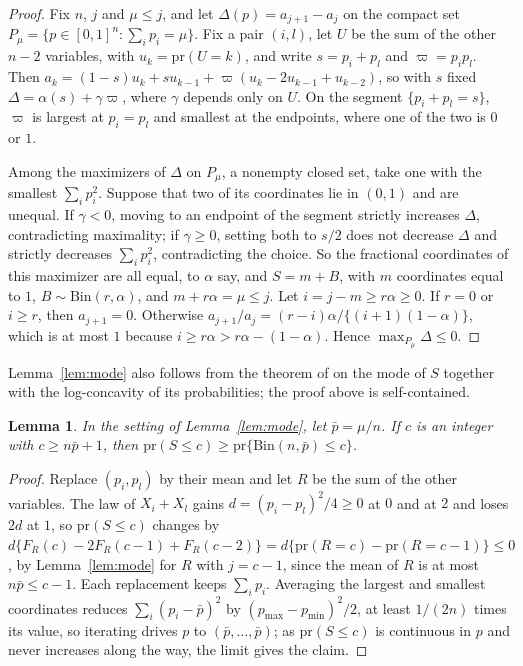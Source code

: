 \documentclass[12pt]{article}
\renewcommand{\_}{\usc\allowbreak}
\newtheorem{lemma}{Lemma}
\theoremstyle{definition}
\numberwithin{equation}{section}
\newcommand{\pr}{\mathrm{pr}}
\newcommand{\Bin}{\mathrm{Bin}}
\begin{document}
\begin{proof}
Fix $n$, $j$ and $\mu \le j$, and let $\Delta(p) = a_{j+1} - a_j$ on the compact set $P_\mu = \{p \in [0, 1]^n : \sum_ip_i = \mu\}$. Fix a pair $(i, l)$, let $U$ be the sum of the other $n - 2$ variables, with $u_k = \pr(U = k)$, and write $s = p_i + p_l$ and $\varpi = p_ip_l$. Then $a_k = (1 - s)u_k + su_{k-1} + \varpi(u_k - 2u_{k-1} + u_{k-2})$, so with $s$ fixed $\Delta = \alpha(s) + \gamma\varpi$, where $\gamma$ depends only on $U$. On the segment $\{p_i + p_l = s\}$, $\varpi$ is largest at $p_i = p_l$ and smallest at the endpoints, where one of the two is $0$ or $1$.

Among the maximizers of $\Delta$ on $P_\mu$, a nonempty closed set, take one with the smallest $\sum_ip_i^2$. Suppose that two of its coordinates lie in $(0, 1)$ and are unequal. If $\gamma < 0$, moving to an endpoint of the segment strictly increases $\Delta$, contradicting maximality; if $\gamma \ge 0$, setting both to $s/2$ does not decrease $\Delta$ and strictly decreases $\sum_ip_i^2$, contradicting the choice. So the fractional coordinates of this maximizer are all equal, to $\alpha$ say, and $S = m + B$, with $m$ coordinates equal to $1$, $B \sim \Bin(r, \alpha)$, and $m + r\alpha = \mu \le j$. Let $i = j - m \ge r\alpha \ge 0$. If $r = 0$ or $i \ge r$, then $a_{j+1} = 0$. Otherwise $a_{j+1}/a_j = (r - i)\alpha/\{(i + 1)(1 - \alpha)\}$, which is at most $1$ because $i \ge r\alpha > r\alpha - (1 - \alpha)$. Hence $\max_{P_\mu}\Delta \le 0$.
\end{proof}

Lemma~\ref{lem:mode} also follows from the theorem of \citet{darroch1964} on the mode of $S$ together with the log-concavity of its probabilities; the proof above is self-contained.

\begin{lemma}\label{lem:bernoulli}
In the setting of Lemma~\ref{lem:mode}, let $\bar p = \mu/n$. If $c$ is an integer with $c \ge n\bar p + 1$, then $\pr(S \le c) \ge \pr\{\Bin(n, \bar p) \le c\}$.
\end{lemma}

\begin{proof}
Replace $(p_i, p_l)$ by their mean and let $R$ be the sum of the other variables. The law of $X_i + X_l$ gains $d = (p_i - p_l)^2/4 \ge 0$ at $0$ and at $2$ and loses $2d$ at $1$, so $\pr(S \le c)$ changes by $d\{F_R(c) - 2F_R(c - 1) + F_R(c - 2)\} = d\{\pr(R = c) - \pr(R = c - 1)\} \le 0$, by Lemma~\ref{lem:mode} for $R$ with $j = c - 1$, since the mean of $R$ is at most $n\bar p \le c - 1$. Each replacement keeps $\sum_ip_i$. Averaging the largest and smallest coordinates reduces $\sum_i(p_i - \bar p)^2$ by $(p_{\max} - p_{\min})^2/2$, at least $1/(2n)$ times its value, so iterating drives $p$ to $(\bar p, \ldots, \bar p)$; as $\pr(S \le c)$ is continuous in $p$ and never increases along the way, the limit gives the claim.
\end{proof}
\end{document}
